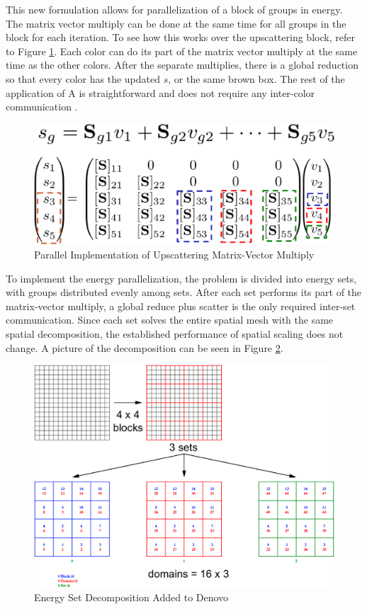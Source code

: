 This new formulation allows for parallelization of a block of groups in energy. The matrix vector multiply can be done at the same time for all groups in the block for each iteration. To see how this works over the upscattering block, refer to Figure \ref{fig:KrylovMultiply}. Each color can do its part of the matrix vector multiply at the same time as the other colors. After the separate multiplies, there is a global reduction so that every color has the updated $s$, or the same brown box. The rest of the application of A is straightforward and does not require any inter-color communication \cite{Evans2010}.
%
\begin{figure}[!h]
  \begin{center}
    \includegraphics [width=.6\textwidth, height=0.2\textheight ] {KrylovGroupMultiply}
  \end{center}
  \caption{Parallel Implementation of Upscattering Matrix-Vector Multiply}
  \label{fig:KrylovMultiply}
\end{figure}

To implement the energy parallelization, the problem is divided into energy sets, with groups distributed evenly among sets. After each set performs its part of the matrix-vector multiply, a global reduce plus scatter is the only required inter-set communication. Since each set solves the entire spatial mesh with the same spatial decomposition, the established performance of spatial scaling does not change. A picture of the decomposition can be seen in Figure \ref{fig:EnergyDecomp}.
%
\begin{figure}[!h]
  \begin{center}
    \includegraphics [width=.8\textwidth, height=0.45\textheight ] {EnergySets}
  \end{center}
  \caption{Energy Set Decomposition Added to Denovo \cite{Evans2011}}
  \label{fig:EnergyDecomp}
\end{figure}

